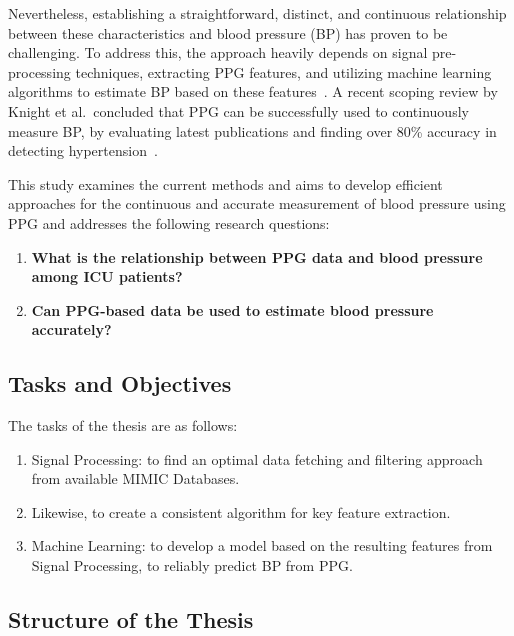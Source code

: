 Nevertheless, establishing a straightforward, distinct, and continuous relationship between these characteristics and blood pressure (BP) has proven to be challenging.
To address this, the approach heavily depends on signal pre-processing techniques, extracting PPG features, and utilizing machine learning algorithms to estimate BP based on these features~\cite{el-hajjDeepLearningModels2021}.
A recent scoping review by Knight et al.\ concluded that PPG can be successfully used to continuously measure BP, by evaluating latest publications and finding over 80\% accuracy in detecting hypertension~\cite{knightAccuracyWearablePhotoplethysmography2022}.

This study examines the current methods and aims to develop efficient approaches for the continuous and accurate measurement of blood pressure using PPG and addresses the following research questions: 

\begin{enumerate}
\item \textbf{What is the relationship between PPG data and blood pressure among ICU patients?}

\item \textbf{Can PPG-based data be used to estimate blood pressure accurately?}

\end{enumerate}

\subsection{Tasks and Objectives}
\label{subsec:tasks_objectives}

The tasks of the thesis are as follows:

\begin{enumerate}
\item Signal Processing: to find an optimal data fetching and filtering approach from available MIMIC Databases.
\item Likewise, to create a consistent algorithm for key feature extraction.
\item Machine Learning: to develop a model based on the resulting features from Signal Processing, to reliably predict BP from PPG\@.
\end{enumerate}

\subsection{Structure of the Thesis}
\label{subsec:structure}

